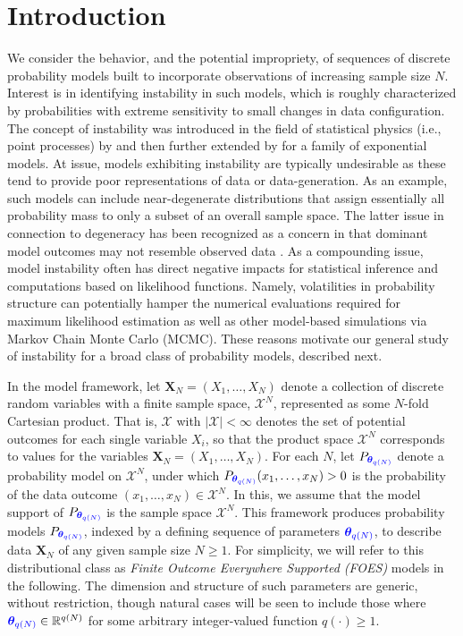 \documentclass[numbib]{imamat}
\theoremstyle{theorem}
\theoremstyle{lemma}
\theoremstyle{example}
\theoremstyle{corollary}
\theoremstyle{definition}
\theoremstyle{remark}
\theoremstyle{approximation}
\theoremstyle{scheme}
\newcommand{\thetaidx}{q(N)}
\newcommand{\thetaN}{\boldsymbol \theta_{\thetaidx}}
\newcommand{\ak}[1]{{\color{blue} #1}}
\begin{document}
\hypertarget{introduction}{%
\section{Introduction}\label{introduction}}

We consider the behavior, and the potential impropriety, of sequences of discrete probability models built to incorporate observations of increasing sample size \(N\). Interest is in identifying instability in such models, which is roughly characterized by probabilities with extreme sensitivity to small changes in data configuration. The concept of instability was introduced in the field of statistical physics (i.e., point processes) by \citet{ruelle1999statistical} and then further extended by \citet{schweinberger2011instability} for a family of exponential models. At issue, models exhibiting instability are typically undesirable as these tend to provide poor representations of data or data-generation. As an example, such models can include near-degenerate distributions that assign essentially all probability mass to only a subset of an overall sample space. The latter issue in connection to degeneracy has been recognized as a concern in that dominant model outcomes may not resemble observed data \citep[cf.~][]{handcock2003assessing}. As a compounding issue, model instability often has direct negative impacts for statistical inference and computations based on likelihood functions. Namely, volatilities in probability structure can potentially hamper the numerical evaluations required for maximum likelihood estimation as well as other model-based simulations via Markov Chain Monte Carlo (MCMC). These reasons motivate our general study of instability for a broad class of probability models, described next.

In the model framework, let \(\boldsymbol X_N = (X_1, \dots, X_N)\) denote a collection of discrete random variables with a finite sample space, \(\mathcal{X}^N\), represented as some \(N\)-fold Cartesian product. That is, \(\mathcal{X}\) with \(|\mathcal{X}| < \infty\) denotes the set of potential outcomes for each single variable \(X_i\), so that the product space \(\mathcal{X}^N\) corresponds to values for the variables \(\boldsymbol X_N=(X_1,\ldots,X_N)\). For each \(N\), let \(P_{\ak{\thetaN}}\) denote a probability model on \(\mathcal{X}^N\), under which \(P_{\ak{\thetaN}}(x_1, \dots, x_N) > 0\) is the probability of the data outcome \((x_1, \dots, x_N) \in \mathcal{X}^N\). In this, we assume that the model support of \(P_{\ak{\thetaN}}\) is the sample space \(\mathcal{X}^N\). This framework produces probability models \(P_{\ak{\thetaN}}\), indexed by a \ak{defining} sequence of parameters \(\ak{\thetaN}\), to describe data \(\boldsymbol X_N\) of any given sample size \(N \geq 1\). For simplicity, we will refer to this distributional class as \emph{Finite Outcome Everywhere Supported (FOES)} models in the following. The dimension and structure of such parameters are generic, without restriction, though natural cases will be seen to include those where \(\ak{\thetaN} \in \mathbb{R}^{q(N)}\) for some arbitrary integer-valued function \(q(\cdot) \geq 1\).
\end{document}
